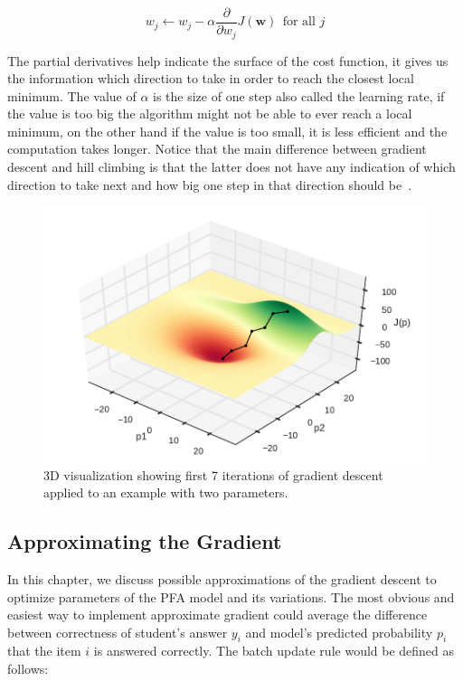 \begin{equation} \label{cost-function-update}
  w_j \gets w_j - \alpha \frac{\partial}{\partial w_j} J(\mathbf{w})~~\text{for all } j
\end{equation}

The partial derivatives help indicate the surface of the cost function, it gives us the information which direction to take in order to reach the closest local minimum. The value of $\alpha$ is the size of one step also called the learning rate, if the value is too big the algorithm might not be able to ever reach a local minimum, on the other hand if the value is too small, it is less efficient and the computation takes longer. Notice that the main difference between gradient descent and hill climbing is that the latter does not have any indication of which direction to take next and how big one step in that direction should be~\cite{Russell2009}.

\begin{figure}[htbp]
  \centering
  \includegraphics[width=\textwidth]{img/gradient-descent}
  \caption{3D visualization showing first 7 iterations of gradient descent applied to an example with two parameters.}
  \label{fig-gradient-descent}
\end{figure}

\subsection{Approximating the Gradient}
\label{approx-gradient}

In this chapter, we discuss possible approximations of the gradient descent to optimize parameters of the PFA model and its variations. The most obvious and easiest way to implement approximate gradient could average the difference between correctness of student's answer $y_i$ and model's predicted probability $p_i$ that the item $i$ is answered correctly. The batch update rule would be defined as follows:

